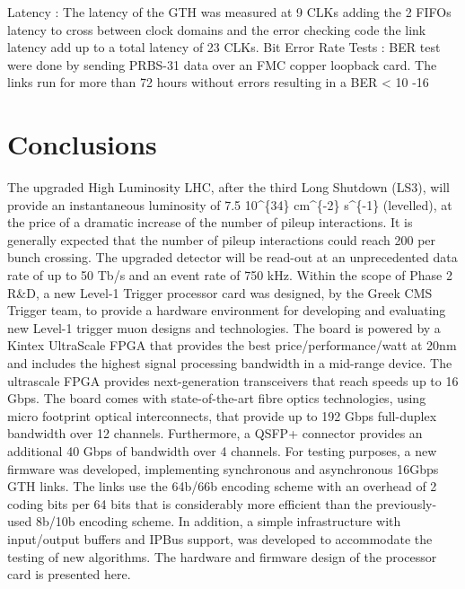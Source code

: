 \documentclass[a4paper]{PoS}
\begin{document}
Latency :
The latency of the GTH was measured at 9 CLKs adding the 2 FIFOs latency to cross between clock domains and the error checking code the link latency add up to a total latency of 23 CLKs. 
Bit Error Rate Tests :
BER test were done by sending PRBS-31 data over an FMC copper loopback card. The links run for more than 72 hours without errors resulting in a BER < 10 -16



\section{Conclusions}
The upgraded High Luminosity LHC, after the third Long Shutdown (LS3), will provide an instantaneous luminosity of 7.5 10\^{}\{34\} cm\^{}\{-2\} s\^{}\{-1\} (levelled), at the price of a dramatic increase of the number of pileup interactions. It is generally expected that the number of pileup interactions could reach 200 per bunch crossing. The upgraded detector will be read-out at an unprecedented data rate of up to 50 Tb/s and an event rate of 750 kHz. Within the scope of Phase 2 R\&D, a new Level-1 Trigger processor card was designed, by the Greek CMS Trigger team, to provide a hardware environment for developing and evaluating new Level-1 trigger muon designs and technologies. The board is powered by a Kintex UltraScale FPGA that provides the best price/performance/watt at 20nm and includes the highest signal processing bandwidth in a mid-range device. The ultrascale FPGA provides next-generation transceivers that reach speeds up to 16 Gbps. The board comes with state-of-the-art fibre optics technologies, using micro footprint optical interconnects, that provide up to 192 Gbps full-duplex bandwidth over 12 channels. Furthermore, a QSFP+ connector provides an additional 40 Gbps of bandwidth over 4 channels. For testing purposes, a new firmware was developed, implementing synchronous and asynchronous 16Gbps GTH links. The links use the 64b/66b encoding scheme with an overhead of 2 coding bits per 64 bits that is considerably more efficient than the previously-used 8b/10b encoding scheme. In addition, a simple infrastructure with input/output buffers and IPBus support, was developed to accommodate the testing of new algorithms. The hardware and firmware design of the processor card is presented here.
\end{document}
